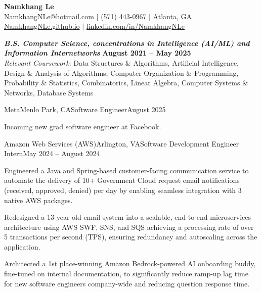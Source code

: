 \documentclass{article}
\begin{document}
\thispagestyle{empty}

\begin{center}
    \textbf{\LARGE Namkhang Le} \\
    NamkhangNLe@hotmail.com $|$ (571) 443-0967 $|$ Atlanta, GA \\
    \href{https://namkhangnle.github.io/}{NamkhangNLe.github.io} $|$ \href{https://www.linkedin.com/in/namkhangnle/}{linkedin.com/in/NamkhangNLe}
\end{center}

\begin{flushleft}


 {}
{\textbf{\textit{B.S. Computer Science, concentrations in Intelligence (AI/ML) and Information Internetworks}} \hfill \textbf{August 2021 -- May 2025} \\ \textit{Relevant Coursework}: Data Structures \& Algorithms, Artificial Intelligence, Design \& Analysis of Algorithms, Computer Organization \& Programming, Probability \& Statistics, Combinatorics, Linear Algebra, Computer Systems \& Networks, Database Systems }


    \begin{experience}{Meta}{Menlo Park, CA}{Software Engineer}{August 2025}
        \item Incoming new grad software engineer at Facebook.

    \end{experience}
    
    \begin{experience}{Amazon Web Services (AWS)}{Arlington, VA}{Software Development Engineer Intern}{May 2024 -- August 2024}
        \item Engineered a Java and Spring-based customer-facing communication service to automate the delivery of 10+ Government Cloud request email notifications (received, approved, denied) per day by enabling seamless integration with 3 native AWS packages.
        \item Redesigned a 13-year-old email system into a scalable, end-to-end microservices architecture using AWS SWF, SNS, and SQS achieving a processing rate of over 5 transactions per second (TPS), ensuring redundancy and autoscaling across the application.
        \item Architected a 1st place-winning Amazon Bedrock-powered AI onboarding buddy, fine-tuned on internal documentation, to significantly reduce ramp-up lag time for new software engineers company-wide and reducing question response time.


\end{experience}
\end{flushleft}
\end{document}

